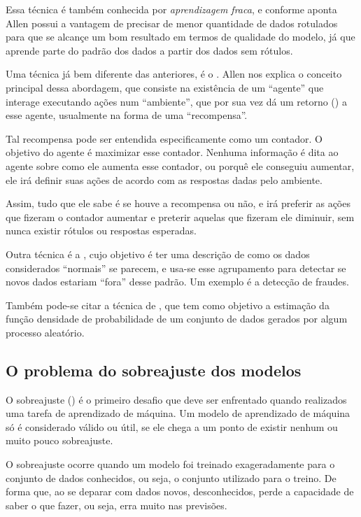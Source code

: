 Essa técnica é também conhecida por \emph{aprendizagem fraca}, e conforme aponta Allen \citep{allen} possui a vantagem de precisar de menor quantidade de dados rotulados para que se alcançe um bom resultado em termos de qualidade do modelo, já que aprende parte do padrão dos dados a partir dos dados sem rótulos.

Uma técnica já bem diferente das anteriores, é o . Allen \citep{allen} nos explica o conceito principal dessa abordagem, que consiste na existência de um ``agente'' que interage executando ações num ``ambiente'', que por sua vez dá um retorno () a esse agente, usualmente na forma de uma ``recompensa''.

Tal recompensa pode ser entendida especificamente como um contador. O objetivo do agente é maximizar esse contador. Nenhuma informação é dita ao agente sobre como ele aumenta esse contador, ou porquê ele conseguiu aumentar, ele irá definir suas ações de acordo com as respostas dadas pelo ambiente. 

Assim, tudo que ele sabe é se houve a recompensa ou não, e irá preferir as ações que fizeram o contador aumentar e preterir aquelas que fizeram ele diminuir, sem nunca existir rótulos ou respostas esperadas.

Outra técnica é a , cujo objetivo é ter uma descrição de como os dados considerados ``normais'' se parecem, e usa-se esse agrupamento para detectar se novos dados estariam ``fora'' desse padrão. Um exemplo é a detecção de fraudes.

Também pode-se citar a técnica de , que tem como objetivo a estimação da função densidade de probabilidade de um conjunto de dados gerados por algum processo aleatório.

\subsection{O problema do sobreajuste dos modelos}

O sobreajuste () é o primeiro desafio que deve ser enfrentado quando realizados uma tarefa de aprendizado de máquina. Um modelo de aprendizado de máquina só é considerado válido ou útil, se ele chega a um ponto de existir nenhum ou muito pouco sobreajuste.

O sobreajuste ocorre quando um modelo foi treinado exageradamente para o conjunto de dados conhecidos, ou seja, o conjunto utilizado para o treino. De forma que, ao se deparar com dados novos, desconhecidos, perde a capacidade de saber o que fazer, ou seja, erra muito nas previsões. 

